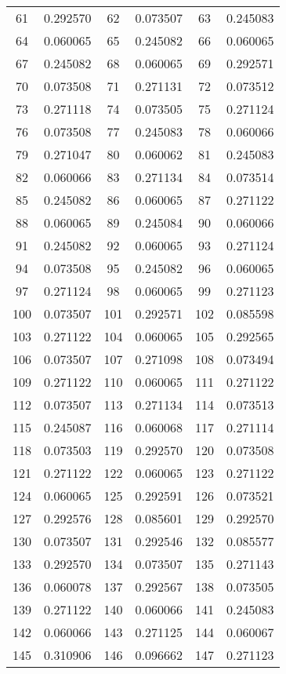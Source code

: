 \documentclass[12pt]{article}
\begin{document}
\begin{longtable}{@{}cc|cc|cc@{}}
61 & 0.292570 & 62 & 0.073507 & 63 & 0.245083 \\
64 & 0.060065 & 65 & 0.245082 & 66 & 0.060065 \\
67 & 0.245082 & 68 & 0.060065 & 69 & 0.292571 \\
70 & 0.073508 & 71 & 0.271131 & 72 & 0.073512 \\
73 & 0.271118 & 74 & 0.073505 & 75 & 0.271124 \\
76 & 0.073508 & 77 & 0.245083 & 78 & 0.060066 \\
79 & 0.271047 & 80 & 0.060062 & 81 & 0.245083 \\
82 & 0.060066 & 83 & 0.271134 & 84 & 0.073514 \\
85 & 0.245082 & 86 & 0.060065 & 87 & 0.271122 \\
88 & 0.060065 & 89 & 0.245084 & 90 & 0.060066 \\
91 & 0.245082 & 92 & 0.060065 & 93 & 0.271124 \\
94 & 0.073508 & 95 & 0.245082 & 96 & 0.060065 \\
97 & 0.271124 & 98 & 0.060065 & 99 & 0.271123 \\
100 & 0.073507 & 101 & 0.292571 & 102 & 0.085598 \\
103 & 0.271122 & 104 & 0.060065 & 105 & 0.292565 \\
106 & 0.073507 & 107 & 0.271098 & 108 & 0.073494 \\
109 & 0.271122 & 110 & 0.060065 & 111 & 0.271122 \\
112 & 0.073507 & 113 & 0.271134 & 114 & 0.073513 \\
115 & 0.245087 & 116 & 0.060068 & 117 & 0.271114 \\
118 & 0.073503 & 119 & 0.292570 & 120 & 0.073508 \\
121 & 0.271122 & 122 & 0.060065 & 123 & 0.271122 \\
124 & 0.060065 & 125 & 0.292591 & 126 & 0.073521 \\
127 & 0.292576 & 128 & 0.085601 & 129 & 0.292570 \\
130 & 0.073507 & 131 & 0.292546 & 132 & 0.085577 \\
133 & 0.292570 & 134 & 0.073507 & 135 & 0.271143 \\
136 & 0.060078 & 137 & 0.292567 & 138 & 0.073505 \\
139 & 0.271122 & 140 & 0.060066 & 141 & 0.245083 \\
142 & 0.060066 & 143 & 0.271125 & 144 & 0.060067 \\
145 & 0.310906 & 146 & 0.096662 & 147 & 0.271123 \\

\end{longtable}
\end{document}
